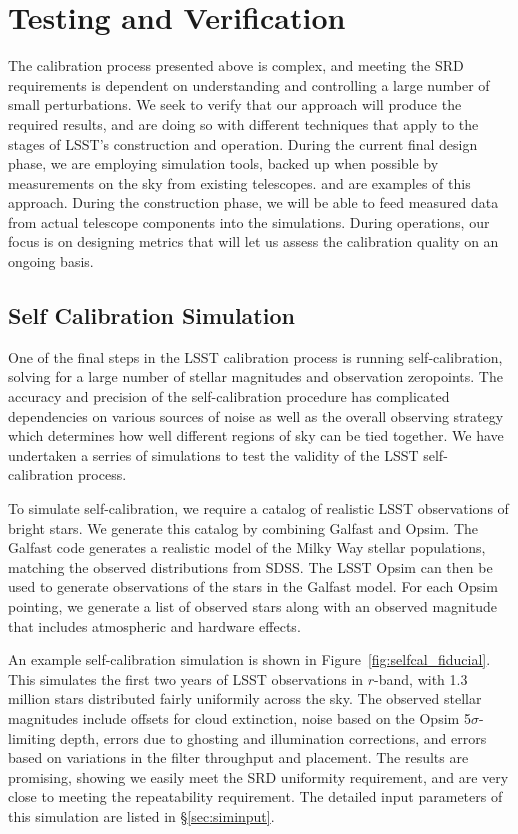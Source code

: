 \documentclass[12pt,preprint]{aastex}
\begin{document}
\section{Testing and Verification}
\label{sec:verification}

The calibration process presented above is complex, and meeting the SRD requirements
is dependent on understanding and controlling a large number of small perturbations.  We seek to verify that our approach will produce the required results, and are doing so with different techniques that apply to the stages of LSST's construction and operation.   During the current final design phase, we are employing simulation tools, backed up when possible by measurements on the sky from existing telescopes.   \citep{Burke2013} and \citep{Burke2010b} are examples of this approach.  During the construction phase, we will be able to feed measured data from actual telescope components into the simulations.   During operations, our focus is on designing metrics that will let us assess the calibration quality on an ongoing basis.

\subsection{Self Calibration Simulation}
\label{sec:selfcalsim}

One of the final steps in the LSST calibration process is running self-calibration, solving for a large number of stellar magnitudes and observation zeropoints.  The accuracy and precision of the self-calibration procedure has complicated dependencies on various sources of noise as well as the overall observing strategy which determines how well different regions of sky can be tied together.  We have undertaken a serries of simulations to test the validity of the LSST self-calibration process.

To simulate self-calibration, we require a catalog of realistic LSST observations of bright stars.  We generate this catalog by combining Galfast and Opsim.  The Galfast code generates a realistic model of the Milky Way stellar populations, matching the observed distributions from SDSS.  The LSST Opsim can then be used to generate observations of the stars in the Galfast model.  For each Opsim pointing, we generate a list of observed stars along with an observed magnitude that includes atmospheric and hardware effects.  

An example self-calibration simulation is shown in Figure~\ref{fig:selfcal_fiducial}.  This simulates the first two years of LSST observations in $r$-band, with 1.3 million stars distributed fairly uniformily across the sky.  The observed stellar magnitudes include offsets for cloud extinction, noise based on the Opsim 5$\sigma$-limiting depth, errors due to ghosting and illumination corrections, and errors based on variations in the filter throughput and placement.  The results are promising, showing we easily meet the SRD uniformity requirement, and are very close to meeting the repeatability requirement.  The detailed input parameters of this simulation are listed in \S\ref{sec:siminput}.
\end{document}
